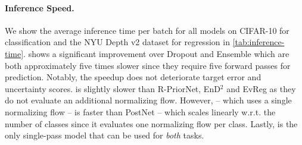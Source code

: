 \paragraph{Inference Speed.} We show the average inference time per batch for all models on CIFAR-10 for classification and the NYU Depth v2 dataset for regression in \cref{tab:inference-time}. \NatPNacro{} shows a significant improvement over Dropout and Ensemble which are both approximately five times slower since they require five forward passes for prediction. Notably, the \NatPNacro{} speedup does not deteriorate target error and uncertainty scores. \NatPNacro{} is slightly slower than R-PriorNet, EnD$^2$ and EvReg as they do not evaluate an additional normalizing flow. However, \NatPNacro{} -- which uses a single normalizing flow -- is faster than PostNet -- which scales linearly w.r.t. the number of classes since it evaluates one normalizing flow per class. Lastly, \NatPNacro{} is the only single-pass model that can be used for \emph{both} tasks.

